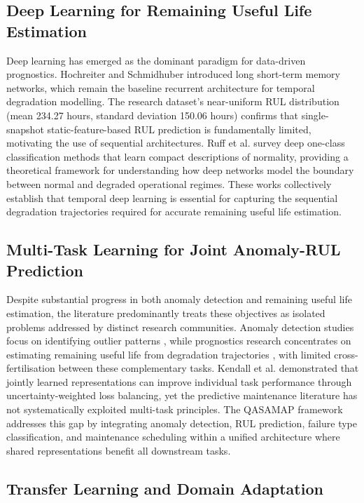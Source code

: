 \subsection{Deep Learning for Remaining Useful Life Estimation}

Deep learning has emerged as the dominant paradigm for data-driven prognostics. Hochreiter and Schmidhuber \cite{Hochreiter1997} introduced long short-term memory networks, which remain the baseline recurrent architecture for temporal degradation modelling. The research dataset's near-uniform RUL distribution (mean 234.27 hours, standard deviation 150.06 hours) confirms that single-snapshot static-feature-based RUL prediction is fundamentally limited, motivating the use of sequential architectures. Ruff et al. \cite{Ruff2021} survey deep one-class classification methods that learn compact descriptions of normality, providing a theoretical framework for understanding how deep networks model the boundary between normal and degraded operational regimes. These works collectively establish that temporal deep learning is essential for capturing the sequential degradation trajectories required for accurate remaining useful life estimation.

\subsection{Multi-Task Learning for Joint Anomaly-RUL Prediction}

Despite substantial progress in both anomaly detection and remaining useful life estimation, the literature predominantly treats these objectives as isolated problems addressed by distinct research communities. Anomaly detection studies focus on identifying outlier patterns \cite{chen_unsupervised_2020}, while prognostics research concentrates on estimating remaining useful life from degradation trajectories \cite{nizam_real-time_2022}, with limited cross-fertilisation between these complementary tasks. Kendall et al. \cite{kendall_multi-task_2017} demonstrated that jointly learned representations can improve individual task performance through uncertainty-weighted loss balancing, yet the predictive maintenance literature has not systematically exploited multi-task principles. The QASAMAP framework addresses this gap by integrating anomaly detection, RUL prediction, failure type classification, and maintenance scheduling within a unified architecture where shared representations benefit all downstream tasks.

\subsection{Transfer Learning and Domain Adaptation}

